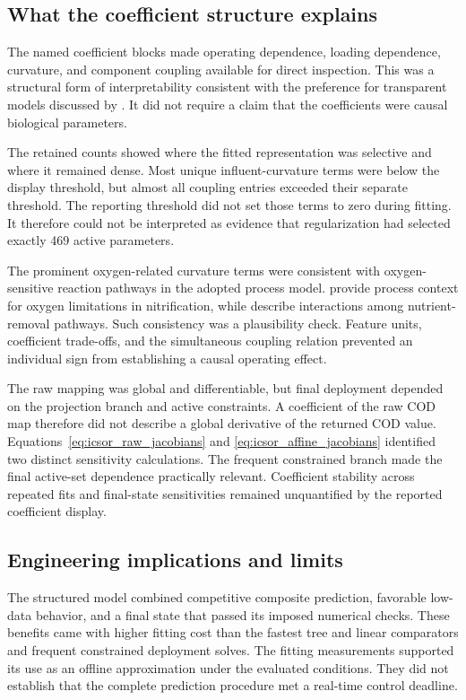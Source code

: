 \subsection{What the coefficient structure explains}

The named coefficient blocks made operating dependence, loading dependence, curvature, and component coupling available for direct inspection. This was a structural form of interpretability consistent with the preference for transparent models discussed by \citet{Rudin2019}. It did not require a claim that the coefficients were causal biological parameters.

The retained counts showed where the fitted representation was selective and where it remained dense. Most unique influent-curvature terms were below the display threshold, but almost all coupling entries exceeded their separate threshold. The reporting threshold did not set those terms to zero during fitting. It therefore could not be interpreted as evidence that regularization had selected exactly 469 active parameters.

The prominent oxygen-related curvature terms were consistent with oxygen-sensitive reaction pathways in the adopted process model. \citet{StenstromSong1991} provide process context for oxygen limitations in nitrification, while \citet{Wentzel1992} describe interactions among nutrient-removal pathways. Such consistency was a plausibility check. Feature units, coefficient trade-offs, and the simultaneous coupling relation prevented an individual sign from establishing a causal operating effect.

The raw mapping was global and differentiable, but final deployment depended on the projection branch and active constraints. A coefficient of the raw COD map therefore did not describe a global derivative of the returned COD value. Equations~\eqref{eq:icsor_raw_jacobians} and \eqref{eq:icsor_affine_jacobians} identified two distinct sensitivity calculations. The frequent constrained branch made the final active-set dependence practically relevant. Coefficient stability across repeated fits and final-state sensitivities remained unquantified by the reported coefficient display.

\subsection{Engineering implications and limits}

The structured model combined competitive composite prediction, favorable low-data behavior, and a final state that passed its imposed numerical checks. These benefits came with higher fitting cost than the fastest tree and linear comparators and frequent constrained deployment solves. The fitting measurements supported its use as an offline approximation under the evaluated conditions. They did not establish that the complete prediction procedure met a real-time control deadline.

